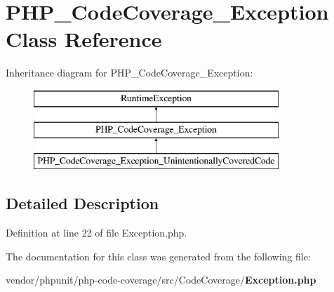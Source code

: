 \section{P\+H\+P\+\_\+\+Code\+Coverage\+\_\+\+Exception Class Reference}
\label{class_p_h_p___code_coverage___exception}
Inheritance diagram for P\+H\+P\+\_\+\+Code\+Coverage\+\_\+\+Exception\+:\begin{figure}[H]
\begin{center}
\leavevmode
\includegraphics[height=3.000000cm]{class_p_h_p___code_coverage___exception}
\end{center}
\end{figure}


\subsection{Detailed Description}


Definition at line 22 of file Exception.\+php.



The documentation for this class was generated from the following file\+:\begin{DoxyCompactItemize}
\item 
vendor/phpunit/php-\/code-\/coverage/src/\+Code\+Coverage/{\bf Exception.\+php}\end{DoxyCompactItemize}
